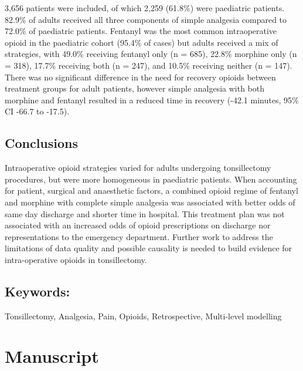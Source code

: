 \documentclass[
  letterpaper,
  DIV=11,
  numbers=noendperiod]{scrreprt}
\begin{document}

3,656 patients were included, of which 2,259 (61.8\%) were paediatric
patients. 82.9\% of adults received all three components of simple
analgesia compared to 72.0\% of paediatric patients. Fentanyl was the
most common intraoperative opioid in the paediatric cohort (95.4\% of
cases) but adults received a mix of strategies, with 49.0\% receiving
fentanyl only (n = 685), 22.8\% morphine only (n = 318), 17.7\%
receiving both (n = 247), and 10.5\% receiving neither (n = 147). There
was no significant difference in the need for recovery opioids between
treatment groups for adult patients, however simple analgesia with both
morphine and fentanyl resulted in a reduced time in recovery (-42.1
minutes, 95\% CI -66.7 to -17.5).

\section*{Conclusions}\label{conclusions}


Intraoperative opioid strategies varied for adults undergoing
tonsillectomy procedures, but were more homogeneous in paediatric
patients. When accounting for patient, surgical and anaesthetic factors,
a combined opioid regime of fentanyl and morphine with complete simple
analgesia was associated with better odds of same day discharge and
shorter time in hospital. This treatment plan was not associated with an
increased odds of opioid prescriptions on discharge nor representations
to the emergency department. Further work to address the limitations of
data quality and possible causality is needed to build evidence for
intra-operative opioids in tonsillectomy.

\section*{Keywords:}\label{keywords}


Tonsillectomy, Analgesia, Pain, Opioids, Retrospective, Multi-level
modelling


\chapter{Manuscript}\label{manuscript}
\end{document}

